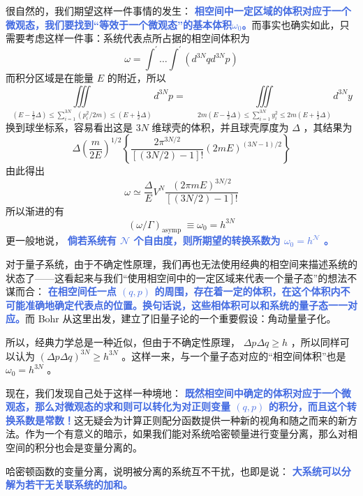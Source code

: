 很自然的，我们期望这样一件事情的发生： \textcolor{RoyalBlue}{\textbf{\kaishu 相空间中一定区域的体积对应于一个微观态，我们要找到“等效于一个微观态”的基本体积$\omega_0$。}}而事实也确实如此，只需要考虑这样一件事：系统代表点所占据的相空间体积为
\begin{equation}
    \omega=\int^{\prime} \ldots \int^{\prime}\left(d^{3 N} q d^{3 N} p\right)
\end{equation}
而积分区域是在能量 $E$ 的附近，所以
\[
    \iiint\limits_{(E-\frac{1}{2} \Delta) \leq \sum_{i=1}^{3 N}\left(p_i^2 / 2 m\right) \leq (E +\frac{1}{2} \Delta)} d^{3 N} p=\quad \iiint\limits_{2m(E-\frac{1}{2} \Delta) \leq \sum_{i=1}^{3 N} y_i^2 \leq 2 m (E + \frac{1}{2} \Delta)
    } d^{3 N} y
\]
换到球坐标系，容易看出这是 $3N$ 维球壳的体积，并且球壳厚度为 $\Delta$ ，其结果为
\[
    \Delta\left(\frac{m}{2 E}\right)^{1 / 2}\left\{\frac{2 \pi^{3 N / 2}}{[(3 N / 2)-1] !}(2 m E)^{(3 N-1) / 2}\right\}
\]
由此得出
\[
    \omega \simeq \frac{\Delta}{E} V^N \frac{(2 \pi m E)^{3 N / 2}}{[(3 N / 2)-1] !}
\]
所以渐进的有
\begin{equation}
    (\omega / \Gamma)_{\text {asymp }} \equiv \omega_0=h^{3 N}
\end{equation}
更一般地说， \textcolor{RoyalBlue}{\textbf{\kaishu 倘若系统有 $\mathcal{N}$ 个自由度，则所期望的转换系数为 $\omega_0 = h^{\mathcal{N}}$ 。}}

对于量子系统，由于不确定性原理，我们再也无法使用经典的相空间来描述系统的状态了——这看起来与我们“使用相空间中的一定区域来代表一个量子态”的想法不谋而合： \textcolor{RoyalBlue}{\textbf{\kaishu  在相空间任一点 $(q,p)$ 的周围，存在着一定的体积，在这个体积内不可能准确地确定代表点的位置。换句话说，这些相体积可以和系统的量子态一一对应。}}而 Bohr 从这里出发，建立了旧量子论的一个重要假设：角动量量子化。

所以，经典力学总是一种近似，但由于不确定性原理， $\Delta p\Delta q \geq h$ ，所以同样可以认为 $(\Delta p\Delta q)^{3N} \geq h^{3N}$ 。这样一来，与一个量子态对应的“相空间体积”也是 $\omega_0 = h^{3N}$ 。

现在，我们发现自己处于这样一种境地： \textcolor{RoyalBlue}{\textbf{\kaishu 既然相空间中确定的体积对应于一个微观态，那么对微观态的求和则可以转化为对正则变量 $(q,p)$ 的积分，而且这个转换系数是常数！}}这无疑会为计算正则配分函数提供一种新的视角和随之而来的新方法。作为一个有意义的暗示，如果我们能对系统哈密顿量进行变量分离，那么对相空间的积分也会是变量分离的。

哈密顿函数的变量分离，说明被分离的系统互不干扰，也即是说： \textcolor{RoyalBlue}{\textbf{\kaishu 大系统可以分解为若干无关联系统的加和。}} 

